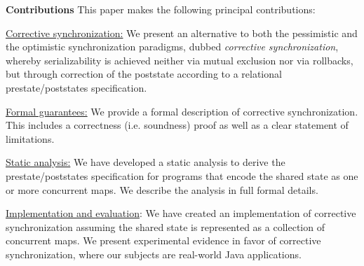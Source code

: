 
\noindent \textbf{Contributions} This paper makes the following principal contributions:
\begin{compactenum}
	\item \underline{Corrective synchronization:} We present an alternative to both the pessimistic and the optimistic synchronization paradigms, dubbed \emph{corrective synchronization}, whereby serializability is achieved neither via mutual exclusion nor via rollbacks, but through correction of the poststate according to a relational prestate/poststates specification.
	\item \underline{Formal guarantees:} We provide a formal description of corrective synchronization. This includes a correctness (i.e. soundness) proof as well as a clear statement of limitations.
	\item \underline{Static analysis:} We have developed a static analysis to derive the prestate/poststates specification for programs that encode the shared state as one or more concurrent maps. We describe the analysis in full formal details.
	\item \underline{Implementation and evaluation}: We have created an implementation of corrective synchronization assuming the shared state is represented as a collection of concurrent maps. We present experimental evidence in favor of corrective synchronization, where our subjects are real-world Java applications.
\end{compactenum}